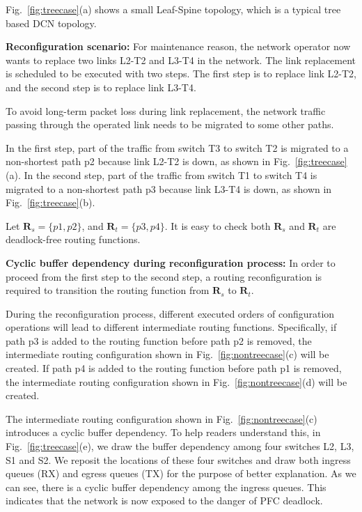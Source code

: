 Fig.~\ref{fig:treecase}(a) shows a small Leaf-Spine topology, which is a typical tree based DCN topology.

\textbf{Reconfiguration scenario:} For maintenance reason, the network operator now wants to replace two links L2-T2 and L3-T4 in the network. The link replacement is scheduled to be executed with two steps. The first step is to replace link L2-T2, and the second step is to replace link L3-T4.

To avoid long-term packet loss during link replacement, the network traffic passing through the operated link needs to be migrated to some other paths. 

In the first step, part of the traffic from switch T3 to switch T2 is migrated to a non-shortest path p2 because link L2-T2 is down, as shown in Fig.~\ref{fig:treecase}(a). In the second step, part of the traffic from switch T1 to switch T4 is migrated to a non-shortest path p3 because link L3-T4 is down, as shown in Fig.~\ref{fig:treecase}(b).

Let $\textbf{R}_s = \{p1, p2\}$, and $\textbf{R}_t = \{p3, p4\}$. It is easy to check both $\textbf{R}_s$ and $\textbf{R}_t$ are deadlock-free routing functions. 

\textbf{Cyclic buffer dependency during reconfiguration process:} In order to proceed from the first step to the second step, a routing reconfiguration is required to transition the routing function from $\textbf{R}_s$ to $\textbf{R}_t$.

During the reconfiguration process, different executed orders of configuration operations will lead to different intermediate routing functions. Specifically, if path p3 is added to the routing function before path p2 is removed, the intermediate routing configuration shown in Fig.~\ref{fig:nontreecase}(c) will be created. If path p4 is added to the routing function before path p1 is removed, the intermediate routing configuration shown in Fig.~\ref{fig:nontreecase}(d) will be created.  

The intermediate routing configuration shown in Fig.~\ref{fig:nontreecase}(c) introduces a cyclic buffer dependency.  To help readers understand this, in Fig.~\ref{fig:treecase}(e), we draw the buffer dependency among four switches L2, L3, S1 and S2. We reposit the locations of these four switches and draw both ingress queues (RX) and egress queues (TX) for the purpose of better explanation. As we can see, there is a cyclic buffer dependency among the ingress queues. This indicates that the network is now exposed to the danger of PFC deadlock.

